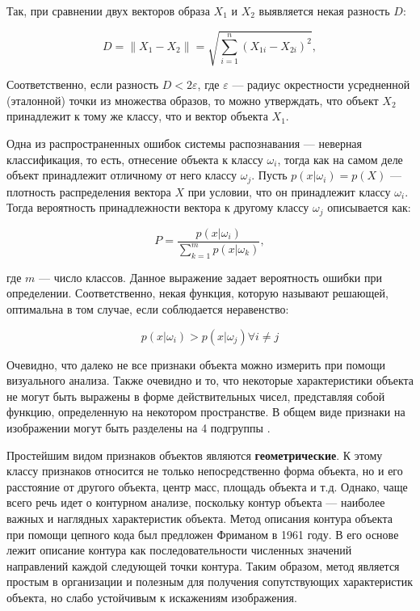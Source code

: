 Так, при сравнении двух векторов образа $X_1$ и $X_2$ выявляется некая разность $D$:

\begin{equation}
D = \|X_1 - X_2\| = \sqrt{\sum_{i=1}^{n} (X_{1i} - X_{2i})^2},
\label{eq_3_2}
\end{equation}

Соответственно, если разность $D < 2\varepsilon$, где $\varepsilon$ --- радиус окрестности усредненной (эталонной) точки из множества образов, то можно утверждать, что объект $X_2$ принадлежит к тому же классу, что и вектор объекта $X_1$.

Одна из распространенных ошибок системы распознавания --- неверная классификация, то есть, отнесение объекта к классу $\omega_i$, тогда как на самом деле объект принадлежит отличному от него классу $\omega_j$. Пусть $p(x | \omega_i) = p(X)$ --- плотность распределения вектора $X$ при условии, что он принадлежит классу $\omega_i$. Тогда вероятность принадлежности вектора к другому классу $\omega_j$ описывается как:

\begin{equation}
P = \frac{p(x | \omega_i)}{\sum_{k=1}^{m}p(x | \omega_k)},
\label{eq_3_3}
\end{equation}

где $m$ --- число классов. Данное выражение задает вероятность ошибки при определении. Соответственно, некая функция, которую называют решающей, оптимальна в том случае, если соблюдается неравенство:

\begin{equation}
p(x | \omega_i) > p(x | \omega_j) \forall i \neq j
\label{eq_3_4}
\end{equation}

Очевидно, что далеко не все признаки объекта можно измерить при помощи визуального анализа. Также очевидно и то, что некоторые характеристики объекта не могут быть выражены в форме действительных чисел, представляя собой функцию, определенную на некотором пространстве. В общем виде признаки на изображении могут быть разделены на 4 подгруппы \cite{Myasnikov}.

Простейшим видом признаков объектов являются \textbf{геометрические}. К этому классу признаков относится не только непосредственно форма объекта, но и его расстояние от другого объекта, центр масс, площадь объекта и т.д. Однако, чаще всего речь идет о контурном анализе, поскольку контур объекта --- наиболее важных и наглядных характеристик объекта. Метод описания контура объекта при помощи цепного кода был предложен Фриманом в 1961 году. В его основе лежит описание контура как последовательности численных значений направлений каждой следующей точки контура. Таким образом, метод является простым в организации и полезным для получения сопутствующих характеристик объекта, но слабо устойчивым к искажениям изображения.

